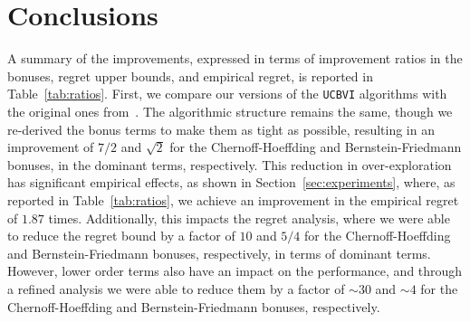 \section{Conclusions}
A summary of the improvements, expressed in terms of improvement ratios in the bonuses, regret upper bounds, and empirical regret, is reported in Table~\ref{tab:ratios}. First, we compare our versions of the \texttt{UCBVI} algorithms with the original ones from~\citep{azar2017minimax}. The algorithmic structure remains the same, though we re-derived the bonus terms to make them as tight as possible, resulting in an improvement of $7/2$ and $\sqrt{2}$ for the Chernoff-Hoeffding and Bernstein-Friedmann bonuses, in the dominant terms, respectively. This reduction in over-exploration has significant empirical effects, as shown in Section~\ref{sec:experiments}, where, as reported in Table~\ref{tab:ratios}, we achieve an improvement in the empirical regret of $1.87$ times. Additionally, this impacts the regret analysis, where we were able to reduce the regret bound by a factor of $10$ and $5/4$ for the Chernoff-Hoeffding and Bernstein-Friedmann bonuses, respectively, in terms of dominant terms. However, lower order terms also have an impact on the performance, and through a refined analysis we were able to reduce them by a factor of $\sim \! 30$ and $\sim \! 4$ for the Chernoff-Hoeffding and Bernstein-Friedmann bonuses, respectively.